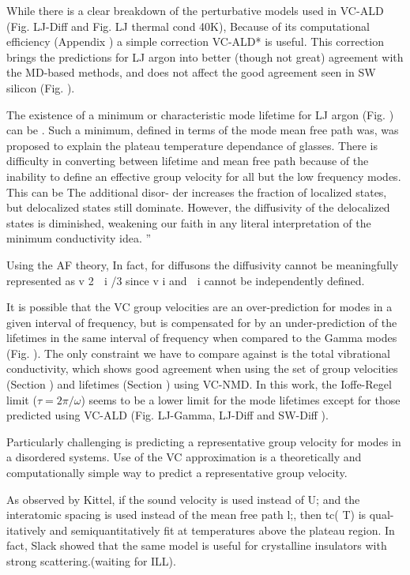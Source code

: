 \documentclass[aps,prb,onecolumn,preprint,superscriptaddress,amsmath,amssymb,floatfix]{revtex4}
\begin{document}
While there is a clear breakdown of the perturbative models used in  
VC-ALD (Fig. LJ-Diff and Fig. LJ thermal cond 40K), 
Because of its computational efficiency (Appendix ) a simple correction 
VC-ALD* is useful. This correction brings the predictions for LJ argon 
into better (though not great) agreement with the MD-based methods, and 
does not affect the good agreement seen in SW silicon (Fig. ). 

The existence of a minimum or characteristic mode lifetime for 
LJ argon (Fig. ) can be . Such a minimum, defined in terms of the mode 
mean free path was, was proposed to explain the plateau 
temperature dependance of glasses.\cite{graebner_phonon_1986} 
There is difficulty in converting 
between lifetime and mean free path because of the inability to 
define an effective group velocity for all but the low frequency modes. 
This can be 
The additional disor-
der increases the fraction of localized states, but delocalized states 
still dominate. However, the
diffusivity of the delocalized states is diminished, 
weakening our faith in any literal interpretation of the
minimum conductivity idea.
'' \cite{feldman_thermal_1993}

Using the AF theory, 
In fact, for diffusons the diffusivity cannot be meaningfully represented 
as v 2 ␶ i /3 since v i and ␶ i cannot be independently
defined.\cite{feldman_numerical_1999}

It is possible that the VC group velocities are an over-prediction 
for modes in a given interval of frequency, 
but is compensated for 
by an under-prediction of the lifetimes in the same interval of 
frequency when compared to the Gamma modes (Fig. ). The only constraint 
we have to compare against is the total vibrational conductivity, which 
shows good agreement when using the set of group velocities (Section )
and lifetimes (Section ) using VC-NMD. 
In this work, the Ioffe-Regel limit ($\tau = 2\pi/\omega $) seems to be 
a lower limit for the mode lifetimes except for those predicted 
using VC-ALD (Fig. LJ-Gamma, LJ-Diff and SW-Diff ).  

Particularly challenging is predicting a representative group velocity 
for modes in a disordered systems. 
Use of the VC approximation is a theoretically and 
computationally simple way to predict a representative group velocity.

As observed by Kittel, if the sound
velocity is used instead of U; and the interatomic spacing
is used instead of the mean free path l;, then tc( T) is qual-
itatively and semiquantitatively
fit at temperatures above
the plateau region.
In fact, Slack showed that the same model 
is useful for crystalline insulators with strong scattering.(waiting for 
ILL).\cite{henry_ehrenreich_thermal_1979}
\end{document}

